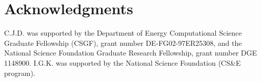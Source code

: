 \documentclass[3p]{elsarticle}
\begin{document}
\section*{Acknowledgments}
 C.J.D. was supported by the Department of Energy Computational Science Graduate Fellowship (CSGF), grant number DE-FG02-97ER25308, and the National Science Foundation Graduate Research Fellowship, grant number DGE 1148900. 
%
I.G.K. was supported by the National Science Foundation (CS\&E program).



%
\end{document}
